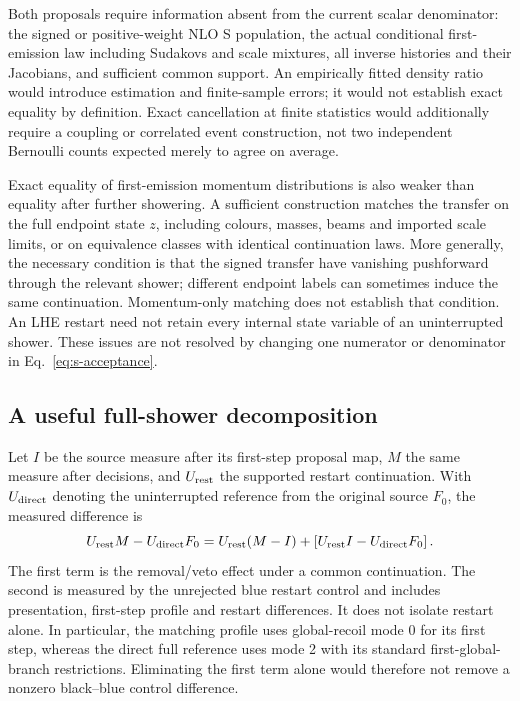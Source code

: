 Both proposals require information absent from the current scalar
denominator: the signed or positive-weight NLO S population, the actual
conditional first-emission law including Sudakovs and scale mixtures,
all inverse histories and their Jacobians, and sufficient common
support. An empirically fitted density ratio would introduce estimation
and finite-sample errors; it would not establish exact equality by
definition. Exact cancellation at finite statistics would additionally
require a coupling or correlated event construction, not two independent
Bernoulli counts expected merely to agree on average.

Exact equality of first-emission momentum distributions is also weaker
than equality after further showering. A sufficient construction matches
the transfer on the full endpoint state $z$, including colours, masses,
beams and imported scale limits, or on equivalence classes with identical
continuation laws. More generally, the necessary condition is that the
signed transfer have vanishing pushforward through the relevant shower;
different endpoint labels can sometimes induce the same continuation.
Momentum-only matching does not establish that condition. An LHE restart
need not retain every internal state variable of an uninterrupted shower.
These issues are not resolved by changing one numerator or denominator in
Eq.~\eqref{eq:s-acceptance}.

\subsection{A useful full-shower decomposition}
Let $I$ be the source measure after its first-step proposal map, $M$ the
same measure after decisions, and $U_{\rm rest}$ the supported restart
continuation. With $U_{\rm direct}$ denoting the uninterrupted reference
from the original source $F_0$, the measured difference is
\begin{equation}
 U_{\rm rest}M-U_{\rm direct}F_0
 =U_{\rm rest}(M-I)
  +\left[U_{\rm rest}I-U_{\rm direct}F_0\right].
 \label{eq:full-decomposition}
\end{equation}
The first term is the removal/veto effect under a common continuation.
The second is measured by the unrejected blue restart control and
includes presentation, first-step profile and restart differences. It
does not isolate restart alone. In particular, the matching profile uses
global-recoil mode 0 for its first step, whereas the direct full reference
uses mode 2 with its standard first-global-branch restrictions.
Eliminating the first term alone would therefore not remove a nonzero
black--blue control difference.
